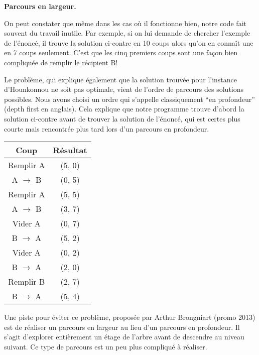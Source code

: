 \documentclass[10pt]{article}\usepackage[nu]{esial}%
\begin{document}
\begin{Exercice}\textbf{Parcours en largeur.}

\noindent
\begin{minipage}{.74\linewidth}
  On peut constater que même dans les cas où il fonctionne bien, notre code fait
  souvent du travail inutile. Par exemple, si on lui demande de chercher
  l'exemple de l'énoncé, il trouve la solution ci-contre en 10 coups alors qu'on
  en connaît une en 7 coups seulement. C'est que les cinq premiers coups sont
  une façon bien compliquée de remplir le récipient B!

  Le problème, qui explique également que la solution trouvée pour l'instance
  d'Hounkonnou ne soit pas optimale, vient de l'ordre de parcours des solutions
  possibles. Nous avons choisi un ordre qui s'appelle classiquement ``en
  profondeur'' (depth first en anglais). Cela explique que notre programme
  trouve d'abord la solution ci-contre avant de trouver la solution de l'énoncé,
  qui est certes plus courte mais rencontrée plus tard lors d'un parcours en
  profondeur.
\end{minipage}\hfill\begin{minipage}{.24\linewidth}
  \begin{tabular}{|c|c|}\hline
    Coup&Résultat\\\hline
    Remplir A         & (5, 0)\\\hline
    A $\rightarrow$ B & (0, 5)\\\hline
    Remplir A         & (5, 5)\\\hline
    A $\rightarrow$ B & (3, 7)\\\hline
    Vider A           & (0, 7)\\\hline
    B $\rightarrow$ A & (5, 2)\\\hline
    Vider A           & (0, 2)\\\hline
    B $\rightarrow$ A & (2, 0)\\\hline
    Remplir B         & (2, 7)\\\hline
    B $\rightarrow$ A & (5, 4)\\\hline
  \end{tabular}
\end{minipage}

Une piste pour éviter ce problème, proposée par Arthur Brongniart (promo 2013)
est de réaliser un parcours en largeur au lieu d'un parcours en profondeur.  Il
s'agit d'explorer entièrement un étage de l'arbre avant de descendre au niveau
suivant. Ce type de parcours est un peu plus compliqué à réaliser.


\end{Exercice}
\end{document}
